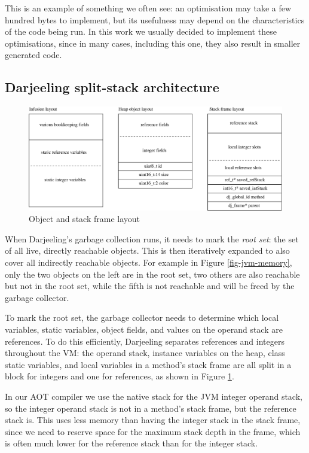 This is an example of something we often see: an optimisation may take a few hundred bytes to implement, but its usefulness may depend on the characteristics of the code being run. In this work we usually decided to implement these optimisations, since in many cases, including this one, they also result in smaller generated code.

\subsection{Darjeeling split-stack architecture}
\label{sec-darjeeling-split-architecure}

\begin{figure}
\centering
\includegraphics[width=0.8\linewidth]{object-and-stack-frame-layout.eps}
\caption{Object and stack frame layout}
\label{fig-object-and-stack-frame-layout}
\end{figure}

When Darjeeling's garbage collection runs, it needs to mark the \emph{root set}: the set of all live, directly reachable objects. This is then iteratively expanded to also cover all indirectly reachable objects. For example in Figure \ref{fig-jvm-memory}, only the two objects on the left are in the root set, two others are also reachable but not in the root set, while the fifth is not reachable and will be freed by the garbage collector.

To mark the root set, the garbage collector needs to determine which local variables, static variables, object fields, and values on the operand stack are references. To do this efficiently, Darjeeling separates references and integers throughout the VM: the operand stack, instance variables on the heap, class static variables, and local variables in a method's stack frame are all split in a block for integers and one for references, as shown in Figure \ref{fig-object-and-stack-frame-layout}.

In our AOT compiler we use the native stack for the JVM integer operand stack, so the integer operand stack is not in a method's stack frame, but the reference stack is. This uses less memory than having the integer stack in the stack frame, since we need to reserve space for the maximum stack depth in the frame, which is often much lower for the reference stack than for the integer stack.

